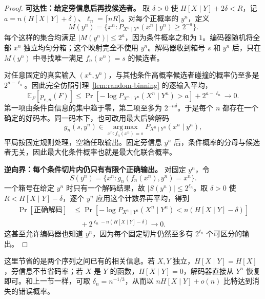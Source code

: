 \documentclass[lang=cn,a4paper,fontset=none,zihao=false,10pt,openany,twoside]{beautybook}
\numberwithin{algorithm}{chapter}
\begin{document}
\begin{proof}
\textbf{可达性：给定旁信息后再找候选者。} 取 $\delta>0$ 使 $H[X\mid Y]+2\delta<R$，记 $a=n(H[X\mid Y]+\delta)$、$\ell_n=\lceil nR\rceil$。对每个正概率的 $y^n$，定义
\[
 M(y^n)=\{x^n:P_{X^n\mid Y^n}(x^n\mid y^n)\ge2^{-a}\}.
\]
每个这样的集合均满足 $|M(y^n)|\le2^a$，因为条件概率之和为 $1$。编码器随机将全部 $x^n$ 独立均匀分箱；这个映射完全不使用 $y^n$。解码器收到箱号 $s$ 和 $y^n$ 后，只在 $M(y^n)$ 中寻找唯一满足 $f_n(x^n)=s$ 的候选者。

对任意固定的真实输入 $(x^n,y^n)$，与其他条件高概率候选者碰撞的概率仍至多是 $2^{a-\ell_n}$。因此完全仿照引理~\ref{lem:random-binning} 的逐输入平均，
\[
 \mathbb E_F[p_{e,n}(F)]
 \le\Pr[-\log P_{X^n\mid Y^n}(X^n\mid Y^n)>a]+2^{a-\ell_n}\to0.
\]
第一项由条件自信息的集中趋于零，第二项至多为 $2^{-n\delta}$。于是每个 $n$ 都存在一个确定的好码本。同一码本下，也可改用最大后验解码
\[
 g_n(s,y^n)\in\operatorname*{arg\,max}_{x^n:f_n(x^n)=s}
 P_{X^n\mid Y^n}(x^n\mid y^n),
\]
平局按固定规则处理，空箱任取输出。固定旁信息 $y^n$ 后，条件概率的分母与候选者无关，因此最大化条件概率也就是最大化联合概率。

\textbf{逆向界：每个条件切片内仍只有有限个正确输出。} 对固定 $y^n$，令
\[
 S(y^n)=\{x^n:g_n(f_n(x^n),y^n)=x^n\}.
\]
一个箱号在给定 $y^n$ 时只有一个解码结果，故 $|S(y^n)|\le2^{\ell_n}$。取 $\delta>0$ 使 $R<H[X\mid Y]-\delta$，逐个 $y^n$ 应用这个计数界再平均，得到
\[
 \begin{aligned}
 \Pr[\text{正确解码}]
 &\le\Pr[-\log P_{X^n\mid Y^n}(X^n\mid Y^n)<n(H[X\mid Y]-\delta)]\\
 &\quad+2^{\ell_n-n(H[X\mid Y]-\delta)}\to0.
 \end{aligned}
\]
这甚至允许编码器也知道 $y^n$，因为每个固定切片仍然至多有 $2^{\ell_n}$ 个可区分的输出。
\end{proof}
这里节省的是两个序列之间已有的相关信息。若 $X,Y$ 独立，$H[X\mid Y]=H[X]$，旁信息不节省码率；若 $X$ 是 $Y$ 的函数，$H[X\mid Y]=0$，解码器直接从 $Y^n$ 恢复即可。和上一节一样，可取 $\delta_n=n^{-1/3}$，从而以 $nH[X\mid Y]+o(n)$ 比特达到消失的错误概率。
\end{document}
